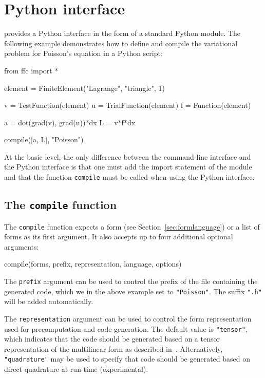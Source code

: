 \chapter{Python interface}

\ffc{} provides a Python interface in the form of a standard
Python module. The following example demonstrates how to define and
compile the variational problem for Poisson's equation in a Python
script:

\begin{code}
from ffc import *

element = FiniteElement("Lagrange", "triangle", 1)

v = TestFunction(element)
u = TrialFunction(element)
f = Function(element)

a = dot(grad(v), grad(u))*dx
L = v*f*dx

compile([a, L], "Poisson")
\end{code}

At the basic level, the only difference between the command-line
interface and the Python interface is that one must add the
import statement of the \ffc{} module and that the function
\texttt{compile} must be called when using the Python interface.

\section{The \texttt{compile} function}

The \texttt{compile} function expects a form (see
Section~\ref{sec:formlanguage}) or a list of forms as its first
argument. It also accepts up to four additional optional arguments:
\begin{code}
compile(forms, prefix, representation, language, options)
\end{code}

The \texttt{prefix} argument can be used to control the prefix of the
file containing the generated code, which we in the above example set
to \texttt{"Poisson"}. The suffix \texttt{".h"} will be added
automatically.

The \texttt{representation} argument can be used to control the form
representation used for precomputation and code generation. The
default value is \texttt{"tensor"}, which indicates that the code
should be generated based on a tensor representation of the
multilinear form as described
in~\cite{KirLog06,KirLog07}. Alternatively, \texttt{"quadrature"} may be
used to specify that code should be generated based on direct
quadrature at run-time (experimental).

